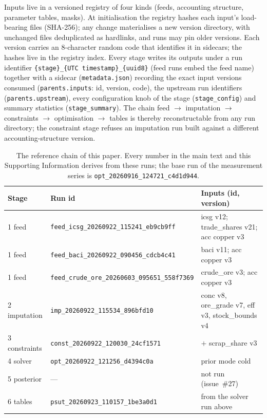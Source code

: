 \documentclass[11pt]{article}
\begin{document}
Inputs live in a versioned registry of four kinds (feeds, accounting
structure, parameter tables, masks). At initialisation the registry hashes
each input's load-bearing files (SHA-256); any change materialises a new
version directory, with unchanged files deduplicated as hardlinks, and runs
may pin older versions. Each version carries an 8-character random code
that identifies it in sidecars; the hashes live in the registry index.
Every stage writes its outputs under a run identifier
\texttt{\{stage\}\_\{UTC timestamp\}\_\{uuid8\}} (feed runs embed the feed
name) together with a sidecar (\texttt{metadata.json}) recording the exact
input versions consumed (\texttt{parents.inputs}: id, version, code), the
upstream run identifiers (\texttt{parents.upstream}), every configuration
knob of the stage (\texttt{stage\_config}) and summary statistics
(\texttt{stage\_summary}). The chain feed $\to$ imputation $\to$ constraints
$\to$ optimisation $\to$ tables is thereby reconstructable from any run
directory; the constraint stage refuses an imputation run built against a
different accounting-structure version.

\begin{table}[h]
\centering\small
\begin{tabular}{@{}lll@{}}
\toprule
Stage & Run id & Inputs (id, version) \\
\midrule
1 feed & \texttt{feed\_icsg\_20260922\_115241\_eb9cb9ff} & icsg v12; trade\_shares v21; acc copper v3 \\
1 feed & \texttt{feed\_baci\_20260922\_090456\_cdcb4c41} & baci v11; acc copper v3 \\
1 feed & \texttt{feed\_crude\_ore\_20260603\_095651\_558f7369} & crude\_ore v3; acc copper v3 \\
2 imputation & \texttt{imp\_20260922\_115534\_896bfd10} & conc v8, ore\_grade v7, eff v3, stock\_bounds v4 \\
3 constraints & \texttt{const\_20260922\_120030\_24cf1571} & $+$ scrap\_share v3 \\
4 solver & \texttt{opt\_20260922\_121256\_d4394c0a} & prior mode cold \\
5 posterior & --- & not run (issue~\#27) \\
6 tables & \texttt{psut\_20260923\_110157\_1be3a0d1} & from the solver run above \\
\bottomrule
\end{tabular}
\caption{The reference chain of this paper. Every number in the main text
and this Supporting Information derives from these runs; the base run of the
measurement series is \texttt{opt\_20260916\_124721\_c4d1d944}.}
\label{tab:si-chain}
\end{table}



\end{document}
